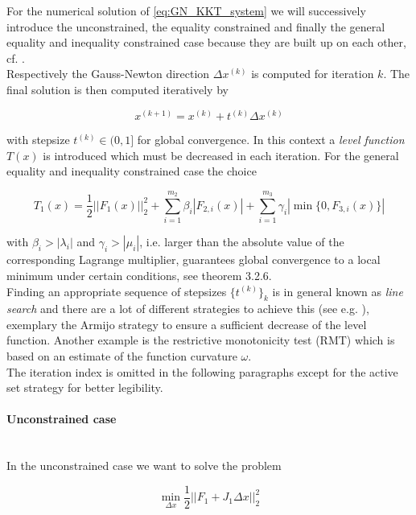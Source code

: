 \documentclass{scrartcl}[12pt, halfparskip]
\numberwithin{equation}{section}
\numberwithin{figure}{section}
\numberwithin{table}{section}
\begin{document}
For the numerical solution of \cref{eq:GN_KKT_system} we will successively introduce the unconstrained, the equality constrained and finally the general equality and inequality constrained case because they are built up on each other, cf. \cite{numerical_methods_lsq_Bjorck}. \\
Respectively the Gauss-Newton direction $\Delta x^{(k)}$ is computed for iteration $k$. The final solution is then computed iteratively by

\begin{equation}
	x^{(k+1)} = x^{(k)} + t^{(k)} \Delta x^{(k)}
\end{equation}

with stepsize $t^{(k)} \in (0,1]$ for global convergence. In this context a \textit{level function} $T(x)$ is introduced which must be decreased in each iteration. For the general equality and inequality constrained case the choice

\begin{equation}
	T_1(x) = \frac{1}{2} || F_1(x) ||_2^2 + \sum_{i=1}^{m_2} \beta_i | F_{2,i}(x) | + \sum_{i=1}^{m_3} \gamma_i | \min\{0,F_{3,i}(x)\} |
\end{equation}

with $\beta_i > |\lambda_i|$ and $\gamma_i > |\mu_i|$, i.e. larger than the absolute value of the corresponding Lagrange multiplier, guarantees global convergence to a local minimum under certain conditions, see \cite{diss_bock} theorem 3.2.6. \\
Finding an appropriate sequence of stepsizes $\{ t^{(k)} \}_k$ is in general known as \textit{line search} and there are a lot of different strategies to achieve this (see e.g. \cite{nonlinear_optimiziation_wright}), exemplary the Armijo strategy to ensure a sufficient decrease of the level function. Another example is the restrictive monotonicity test (RMT) \cite{bock2000_RMT} which is based on an estimate of the function curvature $\omega$. \\

The iteration index is omitted in the following paragraphs except for the active set strategy for better legibility.

\paragraph{Unconstrained case}\mbox{}\\
In the unconstrained case we want to solve the problem

\begin{equation}
\min_{\Delta x} \frac{1}{2} || F_1 + J_1 \Delta x ||_2^2
\label{eq:numerical_solution_LSQ}
\end{equation}
\end{document}
